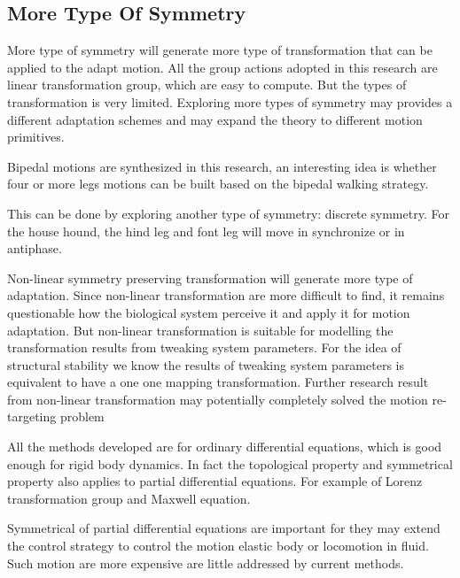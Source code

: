 \subsection{More Type Of Symmetry}
More type of symmetry will generate more type of transformation that can be applied  to the adapt motion.
All the group actions adopted in this research are linear transformation group, which are easy to compute.
But the types of transformation is very limited.
Exploring more types of symmetry may provides a different adaptation schemes and may expand the theory to different motion primitives.
\begin{itemize}

Bipedal motions are synthesized in this research, an interesting idea is whether four or more legs motions can be built based on the bipedal walking strategy.

This can be done by exploring another type of symmetry: discrete symmetry.
For the house hound, the hind leg and font leg will move in synchronize or in antiphase.




Non-linear symmetry preserving transformation will generate more type of adaptation.
Since non-linear transformation are more difficult to find, it remains questionable how the biological system perceive it and apply it for motion adaptation.
But non-linear transformation is suitable for modelling the transformation  results from tweaking system parameters.
For the idea of structural stability we know the results of tweaking system parameters is equivalent to have a one one mapping transformation.
Further research result from non-linear transformation may potentially completely solved the motion re-targeting problem 



All the methods developed are for  ordinary differential equations, which is good enough for rigid body dynamics.
In fact the topological property and symmetrical property also applies to partial differential equations.
For example of Lorenz transformation group and Maxwell equation.

Symmetrical of partial differential equations are important for they may extend the control strategy  to control the motion elastic body or locomotion in fluid.
Such motion are more expensive are little addressed by current \cms methods.


\end{itemize}

